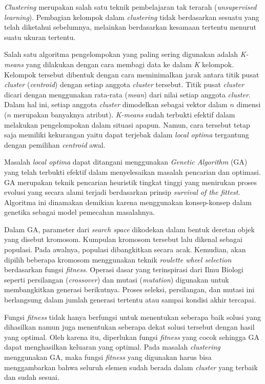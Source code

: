 \documentclass[a4paper,twoside]{article}
\begin{document}
\textit{Clustering} merupakan salah satu teknik pembelajaran tak terarah (\textit{unsupervised learning}). Pembagian kelompok dalam \textit{clustering} tidak berdasarkan sesuatu yang telah diketahui sebelumnya, melainkan berdasarkan kesamaan tertentu menurut suatu ukuran tertentu.

Salah satu algoritma pengelompokan yang paling sering digunakan adalah \textit{K-means} yang dilakukan dengan cara membagi data ke dalam \textit{K} kelompok. Kelompok tersebut dibentuk dengan cara meminimalkan jarak antara titik pusat \textit{cluster} (\textit{centroid}) dengan setiap anggota \textit{cluster} tersebut. Titik pusat \textit{cluster} dicari dengan menggunakan rata-rata (\textit{mean}) dari nilai setiap anggota \textit{cluster}. Dalam hal ini, setiap anggota \textit{cluster} dimodelkan sebagai vektor dalam $n$ dimensi ($n$ merupakan banyaknya atribut). \textit{K-means} sudah terbukti efektif dalam melakukan pengelompokan  dalam situasi apapun. Namun, cara tersebut tetap saja memiliki kekurangan yaitu dapat terjebak dalam \textit{local optima} tergantung dengan pemilihan \textit{centroid} awal.

Masalah \textit{local optima} dapat ditangani menggunakan \textit{Genetic Algorithm} (GA) yang telah terbukti efektif dalam menyelesaikan masalah pencarian dan optimasi. GA merupakan teknik pencarian heuristik tingkat tinggi yang menirukan proses evolusi yang secara alami terjadi berdasarkan prinsip \textit{survival of the fittest}. Algoritma ini dinamakan demikian karena menggunakan konsep-konsep dalam genetika sebagai model pemecahan masalahnya. 

Dalam GA, parameter dari \textit{search space} dikodekan dalam bentuk deretan objek yang disebut kromosom. Kumpulan kromosom tersebut lalu dikenal sebagai populasi. Pada awalnya, populasi dibangkitkan secara acak. Kemudian, akan dipilih beberapa kromosom menggunakan teknik \textit{roulette wheel selection} berdasarkan fungsi \textit{fitness}. Operasi dasar yang terinspirasi dari Ilmu Biologi seperti persilangan (\textit{crossover}) dan mutasi (\textit{mutation}) digunakan untuk membangkitkan generasi berikutnya. Proses seleksi, persilangan, dan mutasi ini berlangsung dalam jumlah generasi tertentu atau sampai kondisi akhir tercapai.

Fungsi \textit{fitness} tidak hanya berfungsi untuk menentukan seberapa baik solusi yang dihasilkan namun juga menentukan seberapa dekat solusi tersebut dengan hasil yang optimal. Oleh karena itu, diperlukan fungsi \textit{fitness} yang cocok sehingga GA dapat menghasilkan keluaran yang optimal. Pada masalah \textit{clustering} menggunakan GA, maka fungsi \textit{fitness} yang digunakan harus bisa menggambarkan bahwa seluruh elemen sudah berada dalam \textit{cluster} yang terbaik dan sudah sesuai.
\end{document}
